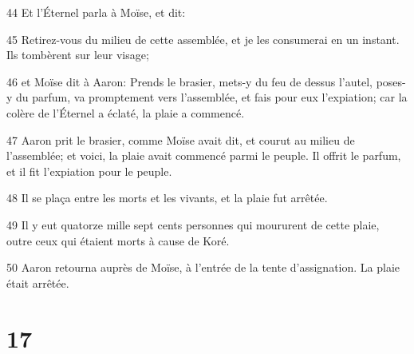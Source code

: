 \par 44 Et l'Éternel parla à Moïse, et dit:
\par 45 Retirez-vous du milieu de cette assemblée, et je les consumerai en un instant. Ils tombèrent sur leur visage;
\par 46 et Moïse dit à Aaron: Prends le brasier, mets-y du feu de dessus l'autel, poses-y du parfum, va promptement vers l'assemblée, et fais pour eux l'expiation; car la colère de l'Éternel a éclaté, la plaie a commencé.
\par 47 Aaron prit le brasier, comme Moïse avait dit, et courut au milieu de l'assemblée; et voici, la plaie avait commencé parmi le peuple. Il offrit le parfum, et il fit l'expiation pour le peuple.
\par 48 Il se plaça entre les morts et les vivants, et la plaie fut arrêtée.
\par 49 Il y eut quatorze mille sept cents personnes qui moururent de cette plaie, outre ceux qui étaient morts à cause de Koré.
\par 50 Aaron retourna auprès de Moïse, à l'entrée de la tente d'assignation. La plaie était arrêtée.

\chapter{17}

